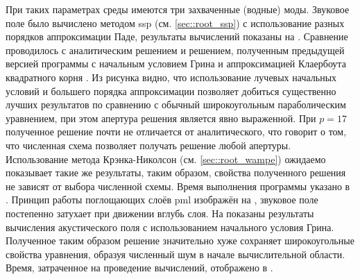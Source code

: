 \documentclass[../document.tex]{subfiles}
\begin{document}
                При таких параметрах среды имеются три захваченные (водные) моды. Звуковое поле было вычислено методом \acrshort{ssp} (см. \ref{sec::root_ssp}) с использование разных порядков аппроксимации Паде, результаты вычислений показаны на . Сравнение проводилось с аналитическим решением и решением, полученным предыдущей версией программы с начальным условием Грина и аппроксимацией Клаербоута квадратного корня \cite{bachelor}. Из рисунка видно, что использование лучевых начальных условий и большего порядка аппроксимации позволяет добиться существенно лучших результатов по сравнению с обычный широкоугольным параболическим уравнением, при этом апертура решения является явно выраженной. При $p=17$ полученное решение почти не отличается от аналитического, что говорит о том, что численная схема позволяет получать решение любой апертуры. Использование метода Крэнка-Николсон (см. \ref{sec::root_wampe}) ожидаемо показывает такие же результаты, таким образом, свойства полученного решения не зависят от выбора численной схемы. Время выполнения программы указано в . Принцип работы поглощающих слоёв \acrshort{pml} изображён на , звуковое поле постепенно затухает при движении вглубь слоя. На  показаны результаты вычисления акустического поля с использованием начального условия Грина. Полученное таким образом решение значительно хуже сохраняет широкоугольные свойства уравнения, образуя численный шум в начале вычислительной области. Время, затраченное на проведение вычислений, отображено в .
\end{document}
